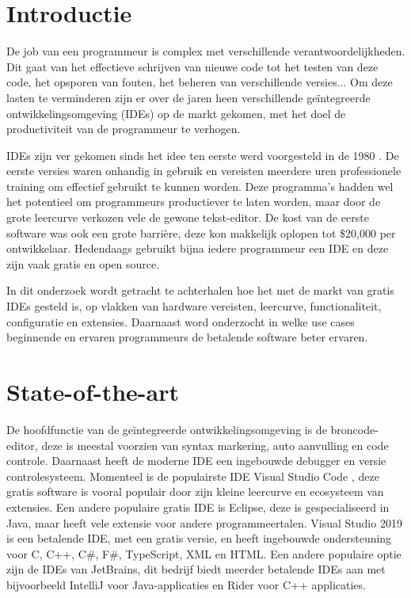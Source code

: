
\section{Introductie} %
\label{sec:introductie}

De job van een programmeur is complex met verschillende verantwoordelijkheden. Dit gaat van het effectieve schrijven van nieuwe code tot het testen van deze code, het opsporen van fouten, het beheren van verschillende versies... Om deze lasten te verminderen zijn er over de jaren heen verschillende geïntegreerde ontwikkelingsomgeving (IDEs) op de markt gekomen, met het doel de productiviteit van de programmeur te verhogen. 

IDEs zijn ver gekomen sinds het idee ten eerste werd voorgesteld in de 1980 \autocite{Kline2005}. De eerste versies waren onhandig in gebruik en vereisten meerdere uren professionele training om effectief gebruikt te kunnen worden. Deze programma’s hadden wel het potentieel om programmeurs productiever te laten worden, maar door de grote leercurve verkozen vele de gewone tekst-editor. De kost van de eerste software was ook een grote barrière, deze kon makkelijk oplopen tot \$20,000 per ontwikkelaar. Hedendaags gebruikt bijna iedere programmeur een IDE en deze zijn vaak gratis en open source. 

In dit onderzoek wordt getracht te achterhalen hoe het met de markt van gratis IDEs gesteld is, op vlakken van hardware vereisten, leercurve, functionaliteit, configuratie en extensies. Daarnaast word onderzocht in welke use cases beginnende en ervaren programmeurs de betalende software beter ervaren.


\section{State-of-the-art}
\label{sec:state-of-the-art}

De hoofdfunctie van de geïntegreerde ontwikkelingsomgeving is de broncode-editor, deze is meestal voorzien van syntax markering, auto aanvulling en code controle. Daarnaast heeft de moderne IDE een ingebouwde debugger en versie controlesysteem. Momenteel is de populairste IDE Visual Studio Code \autocite{StackOverflow2021}, deze gratis software is vooral populair door zijn kleine leercurve en ecosysteem van extensies. Een andere populaire gratis IDE is Eclipse, deze is gespecialiseerd in Java, maar heeft vele extensie voor andere programmeertalen. Visual Studio 2019 is een betalende IDE, met een gratis versie, en heeft ingebouwde ondersteuning voor C, C++, C\#, F\#, TypeScript, XML en HTML. Een andere populaire optie zijn de IDEs van JetBrains, dit bedrijf biedt meerder betalende IDEs aan met bijvoorbeeld IntelliJ voor Java-applicaties en Rider voor C++ applicaties.


